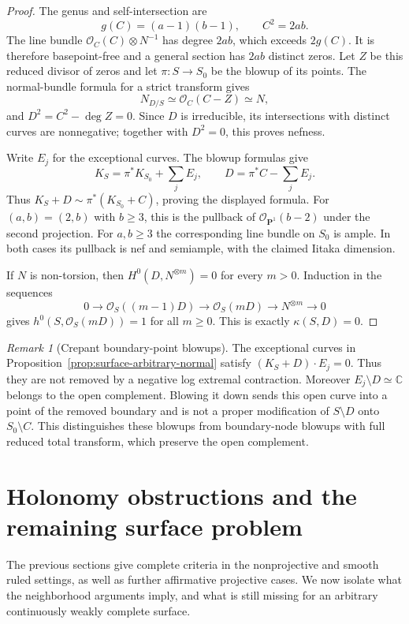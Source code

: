 \documentclass[11pt]{amsart}
\theoremstyle{definition}
\theoremstyle{remark}
\newtheorem{remark}[theorem]{Remark}
\numberwithin{equation}{section}
\newcommand{\C}{\mathbb C}
\newcommand{\PP}{\mathbf P}
\newcommand{\OO}{\mathcal O}
\begin{document}
\begin{proof}
The genus and self-intersection are
\[
 g(C)=(a-1)(b-1),\qquad C^2=2ab.
\]
The line bundle $\OO_C(C)\otimes N^{-1}$ has degree $2ab$, which
exceeds $2g(C)$.  It is therefore basepoint-free and a general
section has $2ab$ distinct zeros.  Let $Z$ be this reduced divisor
of zeros and let $\pi:S\to S_0$ be the blowup of its points.
The normal-bundle formula for a strict transform gives
\[
 N_{D/S}\simeq\OO_C(C-Z)\simeq N,
\]
and $D^2=C^2-\deg Z=0$.  Since $D$ is irreducible, its
intersections with distinct curves are nonnegative; together with
$D^2=0$, this proves nefness.

Write $E_j$ for the exceptional curves.  The blowup formulas give
\[
 K_S=\pi^*K_{S_0}+\sum_jE_j,\qquad
 D=\pi^*C-\sum_jE_j.
\]
Thus $K_S+D\sim\pi^*(K_{S_0}+C)$, proving the displayed formula.
For $(a,b)=(2,b)$ with $b\ge3$, this is the pullback of
$\OO_{\PP^1}(b-2)$ under the second projection.  For $a,b\ge3$
the corresponding line bundle on $S_0$ is ample.  In both cases its
pullback is nef and semiample, with the claimed Iitaka dimension.

If $N$ is non-torsion, then $H^0(D,N^{\otimes m})=0$ for every
$m>0$.  Induction in the sequences
\[
 0\longrightarrow\OO_S((m-1)D)
 \longrightarrow\OO_S(mD)
 \longrightarrow N^{\otimes m}\longrightarrow0
\]
gives $h^0(S,\OO_S(mD))=1$ for all $m\ge0$.  This is exactly
$\kappa(S,D)=0$.
\end{proof}

\begin{remark}[Crepant boundary-point blowups]
\label{rem:surface-crepant-blowup}
The exceptional curves in
Proposition~\ref{prop:surface-arbitrary-normal} satisfy
$(K_S+D)\cdot E_j=0$.  Thus they are not removed by a negative
log extremal contraction.  Moreover $E_j\setminus D\simeq\C$
belongs to the open complement.  Blowing it down sends this open
curve into a point of the removed boundary and is not a proper
modification of $S\setminus D$ onto $S_0\setminus C$.  This
distinguishes these blowups from boundary-node blowups with full
reduced total transform, which preserve the open complement.
\end{remark}

\section{Holonomy obstructions and the remaining surface problem}
\label{sec:surface-remaining}

The previous sections give complete criteria in the nonprojective and
smooth ruled settings, as well as further affirmative projective
cases. We now isolate what the neighborhood arguments imply, and what
is still missing for an arbitrary continuously weakly complete surface.
\end{document}
